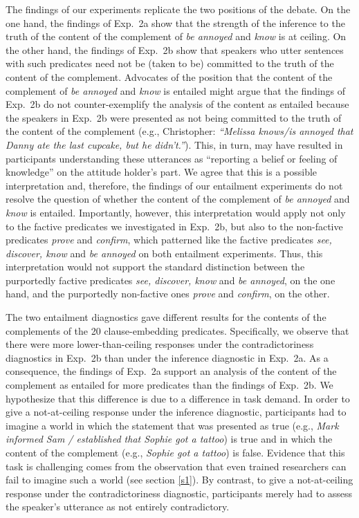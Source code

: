 \documentclass[11pt,fleqn]{article}
\newcommand{\6}{\mbox{$[\hspace*{-.6mm}[$}}
\newcommand{\9}{\mbox{$]\hspace*{-.6mm}]$}}
\begin{document}
{\begin{exe}
\end{exe}
The findings of our experiments replicate the two positions of the debate. On the one hand, the findings of Exp.~2a show that the strength of the inference to the truth of the content of the complement of {\em be annoyed} and {\em know} is at ceiling. On the other hand, the findings of Exp.~2b show that speakers who utter sentences with such predicates need not be (taken to be) committed to the truth of the content of the complement. Advocates of the position that the content of the complement of {\em be annoyed} and {\em know} is entailed might argue that the findings of Exp.~2b do not counter-exemplify the analysis of the content as entailed because the speakers in Exp.~2b were presented as not being committed to the truth of the content of the complement (e.g., Christopher: {\em ``Melissa knows/is annoyed that Danny ate the last cupcake, but he didn't.''}). This, in turn, may have resulted in participants understanding these utterances as ``reporting a belief or feeling of knowledge'' on the attitude holder's part. We agree that this is a possible interpretation and, therefore, the findings of our entailment experiments do not resolve the question of whether the content of the complement of {\em be annoyed} and {\em know} is entailed. Importantly, however, this interpretation would apply not only to the factive predicates we investigated in Exp.~2b, but also to the non-factive predicates {\em prove} and {\em confirm}, which patterned like the factive predicates {\em see, discover, know} and {\em be annoyed} on both entailment experiments. Thus, this interpretation would not support the standard distinction between the purportedly factive predicates {\em see, discover, know} and {\em be annoyed}, on the one hand, and the purportedly non-factive ones  {\em prove} and {\em confirm}, on the other.

The two entailment diagnostics gave different results for the contents of the complements of the 20 clause-embedding predicates. Specifically, we  observe that there were more lower-than-ceiling responses under the contradictoriness diagnostics in Exp.~2b than under the inference diagnostic in Exp.~2a. As a consequence, the findings of Exp.~2a support an analysis of the content of the complement as  entailed for more predicates than the findings of Exp.~2b. We hypothesize that this difference is due to a difference in task demand. In order to give a not-at-ceiling response under the inference diagnostic, participants had to imagine a world in which the statement that was presented as true (e.g., {\em Mark informed Sam / established that Sophie got a tattoo}) is true and in which the content of the complement (e.g., {\em Sophie got a tattoo}) is false. Evidence that this task is challenging comes from the observation that even trained researchers can fail to imagine such a world (see section \ref{s1}). By contrast, to give a not-at-ceiling response under the contradictoriness diagnostic, participants merely had to assess the speaker's utterance as not entirely contradictory. 

}
\end{document}
